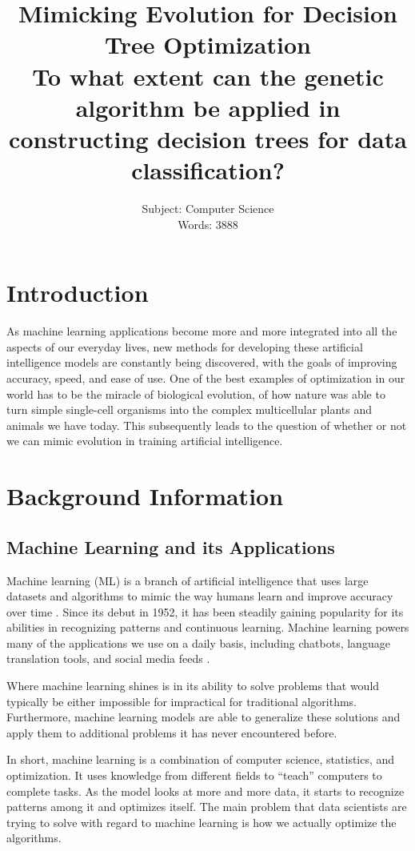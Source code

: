 \documentclass[12pt]{article}
\title{
    Mimicking Evolution for Decision Tree Optimization \\ [6pt]
    \large To what extent can the genetic algorithm be applied in \\
    constructing decision trees for data classification?
}
\author{
    Subject: Computer Science \\
    Words: 3888
}
\date{} %
\begin{document}
\maketitle
\newpage
\tableofcontents
\newpage

\section{Introduction}

As machine learning applications become more and more integrated into all the aspects of our everyday lives, new methods for developing these artificial intelligence models are constantly being discovered, with the goals of improving accuracy, speed, and ease of use. One of the best examples of optimization in our world has to be the miracle of biological evolution, of how nature was able to turn simple single-cell organisms into the complex multicellular plants and animals we have today. This subsequently leads to the question of whether or not we can mimic evolution in training artificial intelligence.

\section{Background Information}

\subsection{Machine Learning and its Applications}

Machine learning (ML) is a branch of artificial intelligence that uses large datasets and algorithms to mimic the way humans learn and improve accuracy over time \cite{what_is_ml_ibm}. Since its debut in 1952, it has been steadily gaining popularity for its abilities in recognizing patterns and continuous learning. Machine learning powers many of the applications we use on a daily basis, including chatbots, language translation tools, and social media feeds \cite{what_is_ml_mit}.

Where machine learning shines is in its ability to solve problems that would typically be either impossible for impractical for traditional algorithms. Furthermore, machine learning models are able to generalize these solutions and apply them to additional problems it has never encountered before.

In short, machine learning is a combination of computer science, statistics, and optimization. It uses knowledge from different fields to ``teach'' computers to complete tasks. As the model looks at more and more data, it starts to recognize patterns among it and optimizes itself. The main problem that data scientists are trying to solve with regard to machine learning is how we actually optimize the algorithms.
\end{document}
